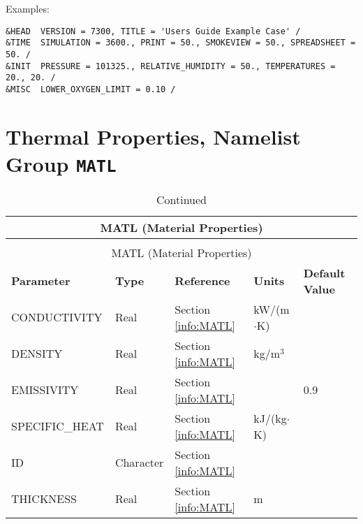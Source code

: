 \noindent Examples:
\begin{lstlisting}
&HEAD  VERSION = 7300, TITLE = 'Users Guide Example Case' /
&TIME  SIMULATION = 3600., PRINT = 50., SMOKEVIEW = 50., SPREADSHEET = 50. /
&INIT  PRESSURE = 101325., RELATIVE_HUMIDITY = 50., TEMPERATURES = 20., 20. /
&MISC  LOWER_OXYGEN_LIMIT = 0.10 /
\end{lstlisting}


\clearpage

\section{Thermal Properties, Namelist Group \texorpdfstring{{\tt MATL}}{MATL}}


\begin{longtable}{@{\extracolsep{\fill}}|l|l|l|l|l|}
\caption[Thermal Properties ({\ct MATL} namelist group)]{For more information see Section~\ref{info:MATL}.}
\label{tbl:MATL} \\
\hline
\multicolumn{5}{|c|}{{\ct MATL} (Material Properties)} \\
\hline \hline
\endfirsthead
\caption[]{Continued} \\
\hline
\multicolumn{5}{|c|}{{\ct MATL} (Material Properties)} \\
\hline \hline
\endhead
\parbox{1.5in}{\bf Parameter}    & \parbox{1in}{\bf Type}  & \parbox{1in}{\bf Reference}  & \parbox{1in}{\bf Units}  & \parbox{1in}{\bf Default Value} \\ \hline
{\ct CONDUCTIVITY}        & Real 	 & Section \ref{info:MATL}                 & kW/(m$\cdot$K)  	&                 \\ \hline
{\ct DENSITY}             & Real 	 & Section \ref{info:MATL}                 & kg/m$^3$ 		&                 \\ \hline
{\ct EMISSIVITY}          & Real	 & Section \ref{info:MATL}                 &         		&   0.9           \\ \hline
{\ct SPECIFIC\_HEAT}      & Real	 & Section \ref{info:MATL}                 & kJ/(kg$\cdot$K)    &                 \\ \hline
{\ct ID}                  & Character    & Section \ref{info:MATL}                 &                    &                 \\ \hline
{\ct THICKNESS}           & Real  	 & Section \ref{info:MATL}                 & m     	        &                 \\ \hline
\end{longtable}

